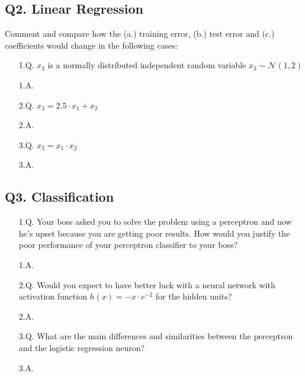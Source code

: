 \documentclass[11pt]{scrartcl}
\begin{document}
\subsection{Q2. Linear Regression}
Comment and compare how the (a.) training error, (b.) test error and (c.) coefficients would change in the following cases:
\begin{itemize}
\item[1.Q.] $x_3$ is a normally distributed independent random variable $x_3 \sim \mathcal{N}(1, 2)$
\item[1.A.] ~\\
\item[2.Q.] $x_3 = 2.5 \cdot x_1 + x_2$
\item[2.A.] ~\\
\item[3.Q.] $x_3 = x_1 \cdot x_2$
\item[3.A.] ~\\
\end{itemize}

\subsection{Q3. Classification}
\begin{itemize}
\item[1.Q.] Your boss asked you to solve the problem using a perceptron and now he's upset because you are getting poor results. How would you justify the poor performance of your perceptron classifier to your boss?
\item[1.A.] ~\\
\item[2.Q.] Would you expect to have better luck with a neural network with activation function $h(x) = - x \cdot e^{-2}$ for the hidden units?
\item[2.A.] ~\\
\item[3.Q.] What are the main differences and similarities between the perceptron and the logistic regression neuron?
\item[3.A.] ~\\
\end{itemize}
\end{document}
